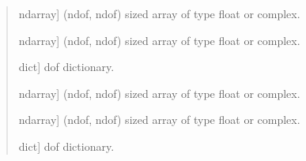 \documentclass[letterpaper,10pt,english]{sphinxmanual}
\begin{document}
\begin{fulllineitems}
\label{\detokenize{core:pywfe.core.model_setup.order_system_faces}}
\pysigstartsignatures
{}
\pysigstopsignatures\begin{quote}\begin{description}
\begin{description}
\sphinxlineitem{\sphinxstylestrong{K}}{[}ndarray{]}
\sphinxAtStartPar
(ndof, ndof) sized array of type float or complex.

\sphinxlineitem{\sphinxstylestrong{M}}{[}ndarray{]}
\sphinxAtStartPar
(ndof, ndof) sized array of type float or complex.

\sphinxlineitem{\sphinxstylestrong{dof}}{[}dict{]}
\sphinxAtStartPar
dof dictionary.

\end{description}

\begin{description}
\sphinxlineitem{\sphinxstylestrong{K}}{[}ndarray{]}
\sphinxAtStartPar
(ndof, ndof) sized array of type float or complex.

\sphinxlineitem{\sphinxstylestrong{M}}{[}ndarray{]}
\sphinxAtStartPar
(ndof, ndof) sized array of type float or complex.

\sphinxlineitem{\sphinxstylestrong{dof}}{[}dict{]}
\sphinxAtStartPar
dof dictionary.

\end{description}

\end{description}\end{quote}

\end{fulllineitems}

\end{document}
